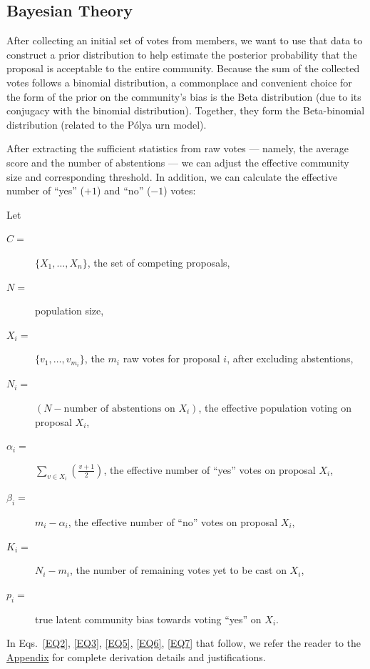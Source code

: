 \documentclass[format=acmsmall, review=true, screen=true, anonymous=true]{acmart}
\begin{document}
\subsection{Bayesian Theory}


After collecting an initial set of votes from members, we want to use that data to construct
a prior distribution to help estimate the posterior probability that the proposal is acceptable
to the entire community.
Because the sum of the collected votes follows a binomial distribution, a commonplace and
convenient choice for the form of the prior on the community's bias is the Beta distribution
(due to its conjugacy with the binomial distribution).
Together, they form the Beta-binomial distribution (related to the P\'olya urn model).

After extracting the sufficient statistics from raw votes --- namely, the average score
and the number of abstentions --- we can adjust the effective community size and corresponding
threshold.
In addition, we can calculate the effective number of ``yes'' ($+1$) and ``no'' ($-1$) votes:

Let
\begin{description}
\item[$C = $] $\{X_1,\ldots, X_n\}$, the set of competing proposals,
\item[$N = $] population size,
\item[$X_i = $] $\{v_1, \ldots, v_{m_i}\}$, the $m_i$ raw votes for proposal $i$, after excluding
abstentions,
\item[$N_i = $] $(N - \textrm{number of abstentions on } X_i)$, the effective population voting
on proposal $X_i$,
\item[$\alpha_i = $] $\sum\limits_{v \in X_i}\left(\frac{v+1}{2}\right)$, the effective number
of ``yes'' votes on proposal $X_i$,
\item[$\beta_i = $] $m_i - \alpha_i$, the effective number of ``no'' votes on proposal $X_i$,
\item[$K_i = $] $N_i - m_i$, the number of remaining votes yet to be cast on $X_i$,
\item[$p_i = $] true latent community bias towards voting ``yes'' on $X_i$.
\end{description}

In Eqs.~\eqref{EQ2}, \eqref{EQ3}, \eqref{EQ5}, \eqref{EQ6}, \eqref{EQ7} that follow, we refer the
reader to the \hyperref[sec:derivation]{Appendix} for complete derivation details and justifications.
\end{document}
